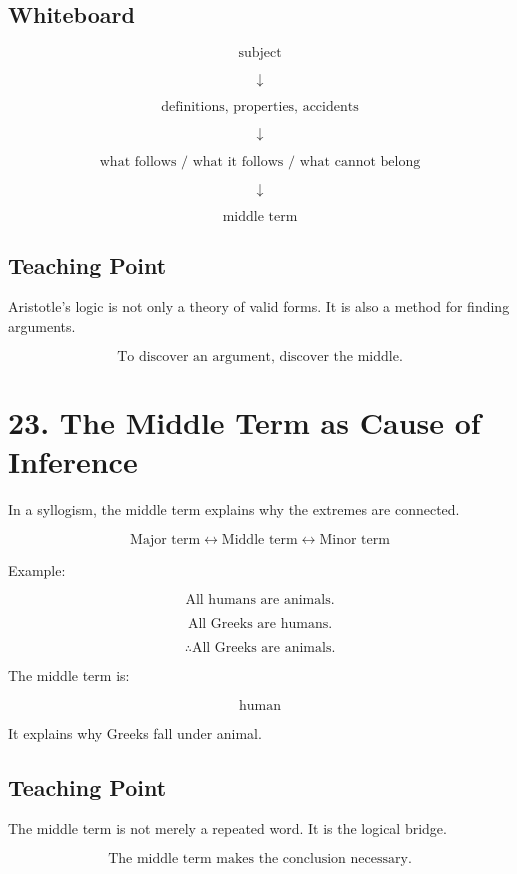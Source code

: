 \documentclass[12pt]{article}
\begin{document}
\subsection*{Whiteboard}

\[
\text{subject}
\]

\[
\downarrow
\]

\[
\text{definitions, properties, accidents}
\]

\[
\downarrow
\]

\[
\text{what follows / what it follows / what cannot belong}
\]

\[
\downarrow
\]

\[
\text{middle term}
\]

\subsection*{Teaching Point}

Aristotle's logic is not only a theory of valid forms. It is also a method for
finding arguments.

\[
\boxed{
\text{To discover an argument, discover the middle.}
}
\]

\section*{23. The Middle Term as Cause of Inference}

In a syllogism, the middle term explains why the extremes are connected.

\[
\text{Major term} \longleftrightarrow \text{Middle term}
\longleftrightarrow \text{Minor term}
\]

Example:

\[
\text{All humans are animals.}
\]

\[
\text{All Greeks are humans.}
\]

\[
\therefore \text{All Greeks are animals.}
\]

The middle term is:

\[
\text{human}
\]

It explains why Greeks fall under animal.

\subsection*{Teaching Point}

The middle term is not merely a repeated word. It is the logical bridge.

\[
\boxed{
\text{The middle term makes the conclusion necessary.}
}
\]
\end{document}
